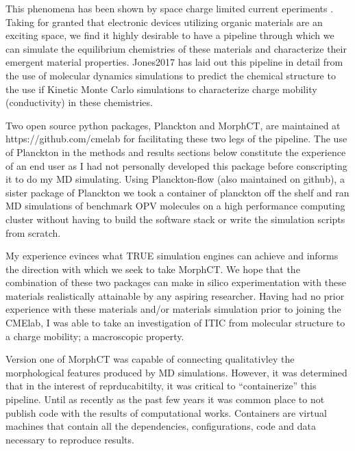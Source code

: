 This phenomena has been shown by space charge limited current eperiments \cite{Small2013}.
Taking for granted that electronic devices utilizing organic materials are an exciting
space,  we find it highly desirable to have a pipeline through which we can simulate the equilibrium
chemistries of these materials and characterize their emergent material properties. Jones2017 has laid out this
pipeline in detail from the use of molecular dynamics simulations to predict the chemical structure to the use
if Kinetic Monte Carlo simulations to characterize charge mobility (conductivity) in these chemistries.

Two open source python packages, Planckton and MorphCT, are maintained at https://github.com/cmelab for
facilitating these two legs of the pipeline. The use of Planckton in the methods and results sections below
constitute the experience of an end user as I had not personally developed this package before conscripting it
to do my MD simulating. Using Planckton-flow (also maintained on github), a sister package
of Planckton we took a container of planckton off the shelf and ran MD simulations of benchmark OPV
molecules on a high performance computing cluster without having to build the software stack or write the
simulation scripts from scratch. 

My experience evinces what TRUE simulation engines can achieve and
informs the direction with which we seek to take MorphCT. We hope that the combination of these two packages
can make in silico experimentation with these materials realistically attainable by any aspiring researcher.
Having had no prior experience with these materials and/or materials simulation prior to joining the CMElab,
I was able to take an investigation of ITIC from molecular
structure to a charge mobility; a macroscopic property. 

Version one of MorphCT was capable of
connecting qualitativley the morphological features produced by MD simulations. However, it was determined
that in the interest of reprducabitilty, it was critical to ``containerize'' this pipeline. Until as recently as
the past few years it was common place to not publish code with the results of computational works. Containers
are virtual machines that contain all the dependencies, configurations, code and data necessary to reproduce
results. \cite{Cito2016a}

